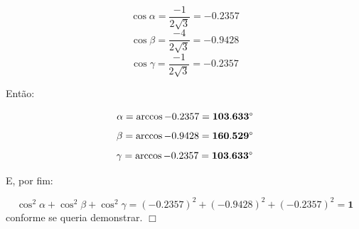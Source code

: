 \documentclass[a4paper,11pt,pagenumber=true]{article}
\theoremstyle{mytheor}
\begin{document}
                \[ \cos \alpha = \frac{-1}{2\sqrt{3}}  = \mathbf{-0.2357} \]
                \[ \cos \beta  = \frac{-4}{2\sqrt{3}} = \mathbf{-0.9428} \]
                \[ \cos \gamma = \frac{-1}{2\sqrt{3}}  = \mathbf{-0.2357} \]
        
                Então:
                
                \[\alpha = \arccos -0.2357 = \mathbf{103.633\degree}\]
                \[\beta  = \arccos -0.9428 = \mathbf{160.529\degree}\]
                \[\gamma = \arccos -0.2357 = \mathbf{103.633\degree}\]
                
                E, por fim: 
                
                \[ 
                    \cos^2 \alpha + \cos^2 \beta + \cos^2 \gamma = 
                    (-0.2357)^2 + (-0.9428)^2 + (-0.2357)^2 = \mathbf{1}
                \] conforme se queria demonstrar. $\Box$
    
\nocite{*}


\end{document}
